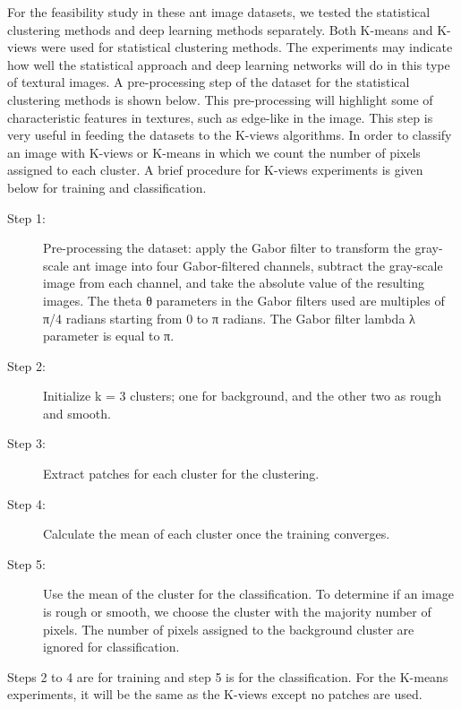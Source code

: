 \documentclass{aci}
\numberwithin{equation}{section}
\begin{document}
For the feasibility study in these ant image datasets, we tested the statistical
clustering methods and deep learning methods separately. Both K-means and
K-views were used for statistical clustering methods. The experiments may
indicate how well the statistical approach and deep learning networks will do in
this type of textural images. A pre-processing step of the dataset for the
statistical clustering methods is shown below. This pre-processing will
highlight some of characteristic features in textures, such as edge-like in the
image. This step is very useful in feeding the datasets to the K-views
algorithms. In order to classify an image with K-views or K-means in which we
count the number of pixels assigned to each cluster. A brief procedure for
K-views experiments is given below for training and classification.
\begin{description}
    \item[Step 1:] Pre-processing the dataset: apply the Gabor filter to
          transform the gray-scale ant image into four Gabor-filtered channels,
          subtract the gray-scale image from each channel, and take the absolute
          value of the resulting images. The theta θ parameters in the Gabor
          filters used are multiples of π/4 radians starting from 0 to π
          radians. The Gabor filter lambda λ parameter is equal to π.

    \item[Step 2:] Initialize k = 3 clusters; one for background, and the other
          two as rough and smooth.

    \item[Step 3:] Extract patches for each cluster for the clustering.

    \item[Step 4:] Calculate the mean of each cluster once the training
          converges.

    \item[Step 5:] Use the mean of the cluster for the classification. To
          determine if an image is rough or smooth, we choose the cluster with
          the majority number of pixels. The number of pixels assigned to the
          background cluster are ignored for classification.
\end{description}

\noindent Steps 2 to 4 are for training and step 5 is for the classification.
For the K-means experiments, it will be the same as the K-views except no
patches are used.
\newline
\end{document}
